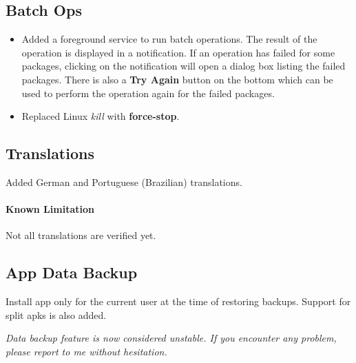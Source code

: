 \subsection{Batch Ops}
\begin{itemize}
    \item Added a foreground service to run batch operations. The result of the operation is displayed in a notification.
    If an operation has failed for some packages, clicking on the notification will open a dialog box listing the failed
    packages. There is also a \textbf{Try Again} button on the bottom which can be used to perform the operation again for the failed packages.
    \item Replaced Linux \textit{kill} with \textbf{force-stop}.
\end{itemize}

\subsection{Translations}
Added German and Portuguese (Brazilian) translations.

\paragraph{Known Limitation} Not all translations are verified yet.

\subsection{App Data Backup}
Install app only for the current user at the time of restoring backups. Support for split apks is also added.

\textit{Data backup feature is now considered unstable. If you encounter any problem, please report to me without hesitation.}
